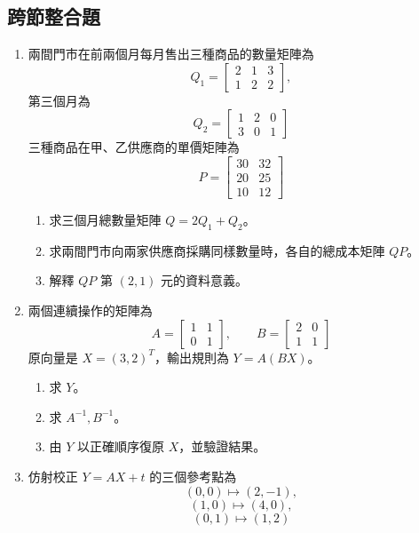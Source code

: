 \documentclass[11pt,a4paper]{article}
\providecommand{\tightlist}{%
  \setlength{\itemsep}{0pt}\setlength{\parskip}{0pt}}
\begin{document}
\subsection{跨節整合題}\label{ux8de8ux7bc0ux6574ux5408ux984c}

\begin{enumerate}
\def\labelenumi{\arabic{enumi}.}
\setcounter{enumi}{12}
\item
  兩間門市在前兩個月每月售出三種商品的數量矩陣為
  \[
  Q_1=\begin{bmatrix}2&1&3\\1&2&2\end{bmatrix},
  \]
  第三個月為
  \[
  Q_2=\begin{bmatrix}1&2&0\\3&0&1\end{bmatrix}
  \]
  三種商品在甲、乙供應商的單價矩陣為
  \[
  P=\begin{bmatrix}30&32\\20&25\\10&12\end{bmatrix}
  \]

  \begin{enumerate}
  \def\labelenumii{\arabic{enumii}.}
  \tightlist
  \item
    求三個月總數量矩陣 \(Q=2Q_1+Q_2\)。
  \item
    求兩間門市向兩家供應商採購同樣數量時，各自的總成本矩陣 \(QP\)。
  \item
    解釋 \(QP\) 第 \((2,1)\) 元的資料意義。
  \end{enumerate}
\item
  兩個連續操作的矩陣為
  \[
  A=\begin{bmatrix}1&1\\0&1\end{bmatrix},
  \qquad
  B=\begin{bmatrix}2&0\\1&1\end{bmatrix}
  \]
  原向量是 \(X=(3,2)^T\)，輸出規則為 \(Y=A(BX)\)。

  \begin{enumerate}
  \def\labelenumii{\arabic{enumii}.}
  \tightlist
  \item
    求 \(Y\)。
  \item
    求 \(A^{-1},B^{-1}\)。
  \item
    由 \(Y\) 以正確順序復原 \(X\)，並驗證結果。
  \end{enumerate}
\item
  仿射校正 \(Y=AX+t\) 的三個參考點為
  \[
  (0,0)\mapsto(2,-1),
  \]
  \[
  (1,0)\mapsto(4,0),
  \]
  \[
  (0,1)\mapsto(1,2)
  \]


\end{enumerate}
\end{document}
